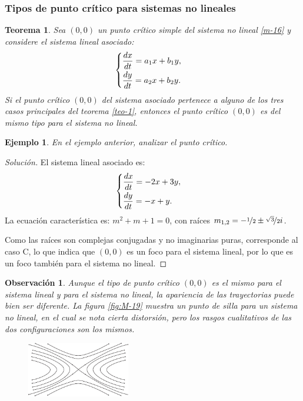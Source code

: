 \documentclass[a5paper,doc,10pt,noapacite]{apa6}
\newtheorem{teorema}{Teorema}
\newtheorem{observ}{Observación}
\newtheorem{ejem}{Ejemplo}
\begin{document}
{{\newpage

\subsubsection{Tipos de punto crítico para sistemas no lineales}

\begin{teorema}\label{teo-6}
	Sea \((0,0)\) un punto crítico simple del sistema no lineal \eqref{m-16} y considere el sistema lineal asociado:
	\[
		\begin{cases}
			\dfrac{dx}{dt}=a_1 x + b_1 y,	\vspace{0.3em}
			\\
			\dfrac{dy}{dt}= a_2 x + b_2 y.
		\end{cases}
	\]
	Si el punto crítico \((0,0)\) del sistema asociado pertenece a alguno de los tres casos principales del  teorema \eqref{teo-1}, entonces el punto crítico \((0,0)\) es del mismo tipo para el sistema no lineal.
\end{teorema}

\begin{ejem}
	En el ejemplo anterior, analizar el punto crítico.
\end{ejem}
\begin{proof}[Solución]
	El sistema lineal asociado es:
	\[
		\begin{cases}
			\dfrac{dx}{dt}=-2 x + 3 y,	\vspace{0.3em}
			\\
			\dfrac{dy}{dt}=  {-x} +  y.
		\end{cases}
	\]
	La ecuación característica es: \(m^2+m+1=0\), con raíces \(m_{1,2}=-\nicefrac{1}{2}\pm\nicefrac{\sqrt{3}}{2}i\).
	
	Como las raíces son complejas conjugadas y no imaginarias puras, corresponde al caso C, lo que indica que \((0,0)\) es un foco para el sistema lineal, por lo que es un foco también para el sistema no lineal.
\end{proof}

\begin{observ}
	Aunque el tipo de punto crítico \((0,0)\) es el mismo para el sistema lineal y para el sistema no lineal, la apariencia de las trayectorias puede bien ser diferente. La figura \ref{fig:M-19} muestra un punto de silla para un sistema no lineal, en el cual se nota cierta distorsión, pero los rasgos cualitativos de las dos configuraciones son los mismos.
	
	\vspace{-1\baselineskip}
	\begin{figure}[H]
		\captionsetup{justification=centering, labelfont=footnotesize, font=footnotesize}
		\centering
		\includegraphics[width=4.5cm]{Graficos/figura19}
	

\end{figure}
\end{observ}}}
\end{document}
